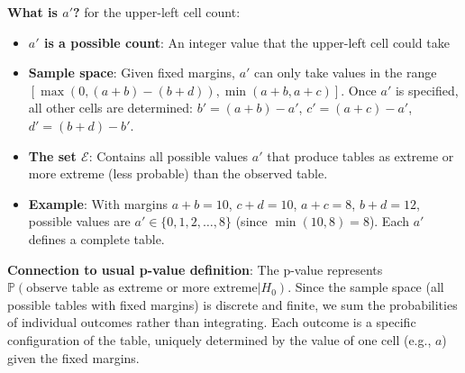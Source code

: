 \textbf{What is $a'$?}
 for the upper-left cell count:
\begin{itemize}
    \item \textbf{$a'$ is a possible count}: An integer value that the upper-left cell could take
    \item \textbf{Sample space}: Given fixed margins, $a'$ can only take values in the range
        $[\max(0, (a+b)-(b+d)), \min(a+b, a+c)]$. Once $a'$ is specified, all other cells are determined:
        $b' = (a+b) - a'$, $c' = (a+c) - a'$, $d' = (b+d) - b'$.
    \item \textbf{The set $\mathcal{E}$}: Contains all possible values $a'$ that produce tables as extreme
        or more extreme (less probable) than the observed table.
    \item \textbf{Example}: With margins $a+b=10$, $c+d=10$, $a+c=8$, $b+d=12$, possible values are
        $a' \in \{0, 1, 2, \ldots, 8\}$ (since $\min(10,8)=8$). Each $a'$ defines a complete table.
\end{itemize}

\textbf{Connection to usual p-value definition}:
The p-value represents $\mathbb{P}(\text{observe table as extreme or more extreme} | H_0)$. Since the
sample space (all possible tables with fixed margins) is discrete and finite, we sum the probabilities
of individual outcomes rather than integrating. Each outcome is a specific configuration of the table,
uniquely determined by the value of one cell (e.g., $a$) given the fixed margins.

